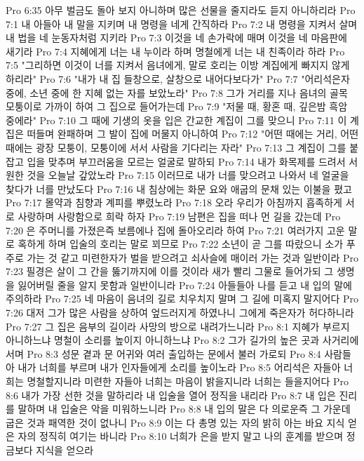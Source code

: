 Pro 6:35  아무 벌금도 돌아 보지 아니하며 많은 선물을 줄지라도 듣지 아니하리라
Pro 7:1  내 아들아 내 말을 지키며 내 명령을 네게 간직하라
Pro 7:2  내 명령을 지켜서 살며 내 법을 네 눈동자처럼 지키라
Pro 7:3  이것을 네 손가락에 매며 이것을 네 마음판에 새기라
Pro 7:4  지혜에게 너는 내 누이라 하며 명철에게 너는 내 친족이라 하라
Pro 7:5  "그리하면 이것이 너를 지켜서 음녀에게, 말로 호리는 이방 계집에게 빠지지 않게 하리라"
Pro 7:6  "내가 내 집 들창으로, 살창으로 내어다보다가"
Pro 7:7  "어리석은자 중에, 소년 중에 한 지혜 없는 자를 보았노라"
Pro 7:8  그가 거리를 지나 음녀의 골목 모퉁이로 가까이 하여 그 집으로 들어가는데
Pro 7:9  "저물 때, 황혼 때, 깊은밤 흑암 중에라"
Pro 7:10  그 때에 기생의 옷을 입은 간교한 계집이 그를 맞으니
Pro 7:11  이 계집은 떠들며 완패하며 그 발이 집에 머물지 아니하여
Pro 7:12  "어떤 때에는 거리, 어떤 때에는 광장 모퉁이, 모퉁이에 서서 사람을 기다리는 자라"
Pro 7:13  그 계집이 그를 붙잡고 입을 맞추며 부끄러움을 모르는 얼굴로 말하되
Pro 7:14  내가 화목제를 드려서 서원한 것을 오늘날 갚았노라
Pro 7:15  이러므로 내가 너를 맞으려고 나와서 네 얼굴을 찾다가 너를 만났도다
Pro 7:16  내 침상에는 화문 요와 애굽의 문채 있는 이불을 폈고
Pro 7:17  몰약과 침향과 계피를 뿌렸노라
Pro 7:18  오라 우리가 아침까지 흡족하게 서로 사랑하며 사랑함으로 희락 하자
Pro 7:19  남편은 집을 떠나 먼 길을 갔는데
Pro 7:20  은 주머니를 가졌은즉 보름에나 집에 돌아오리라 하여
Pro 7:21  여러가지 고운 말로 혹하게 하며 입술의 호리는 말로 꾀므로
Pro 7:22  소년이 곧 그를 따랐으니 소가 푸주로 가는 것 같고 미련한자가 벌을 받으려고 쇠사슬에 매이러 가는 것과 일반이라
Pro 7:23  필경은 살이 그 간을 뚫기까지에 이를 것이라 새가 빨리 그물로 들어가되 그 생명을 잃어버릴 줄을 알지 못함과 일반이니라
Pro 7:24  아들들아 나를 듣고 내 입의 말에 주의하라
Pro 7:25  네 마음이 음녀의 길로 치우치지 말며 그 길에 미혹지 말지어다
Pro 7:26  대저 그가 많은 사람을 상하여 엎드러지게 하였나니 그에게 죽은자가 허다하니라
Pro 7:27  그 집은 음부의 길이라 사망의 방으로 내려가느니라
Pro 8:1  지혜가 부르지 아니하느냐 명철이 소리를 높이지 아니하느냐
Pro 8:2  그가 길가의 높은 곳과 사거리에 서며
Pro 8:3  성문 곁과 문 어귀와 여러 출입하는 문에서 불러 가로되
Pro 8:4  사람들아 내가 너희를 부르며 내가 인자들에게 소리를 높이노라
Pro 8:5  어리석은 자들아 너희는 명철할지니라 미련한 자들아 너희는 마음이 밝을지니라 너희는 들을지어다
Pro 8:6  내가 가장 선한 것을 말하리라 내 입술을 열어 정직을 내리라
Pro 8:7  내 입은 진리를 말하며 내 입술은 악을 미워하느니라
Pro 8:8  내 입의 말은 다 의로운즉 그 가운데 굽은 것과 패역한 것이 없나니
Pro 8:9  이는 다 총명 있는 자의 밝히 아는 바요 지식 얻은 자의 정직히 여기는 바니라
Pro 8:10  너희가 은을 받지 말고 나의 훈계를 받으며 정금보다 지식을 얻으라
